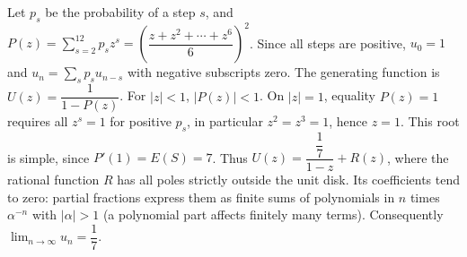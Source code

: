 Let $p_s$ be the probability of a step $s$, and $P(z)=\sum_{s=2}^{12}p_sz^s=(\dfrac{z+z^2+\cdots+z^6}{6})^2$. Since all steps are positive, $u_0=1$ and $u_n=\sum_s p_su_{n-s}$ with negative subscripts zero. The generating function is $U(z)=\dfrac{1}{1-P(z)}$. For $|z|<1$, $|P(z)|<1$. On $|z|=1$, equality $P(z)=1$ requires all $z^s=1$ for positive $p_s$, in particular $z^2=z^3=1$, hence $z=1$. This root is simple, since $P'(1)=E(S)=7$. Thus $U(z)=\dfrac{\dfrac{1}{7}}{1-z}+R(z)$, where the rational function $R$ has all poles strictly outside the unit disk. Its coefficients tend to zero: partial fractions express them as finite sums of polynomials in $n$ times $\alpha^{-n}$ with $|\alpha|>1$ (a polynomial part affects finitely many terms). Consequently $\boxed{\lim_{n\to\infty}u_n=\dfrac{1}{7}}$.
